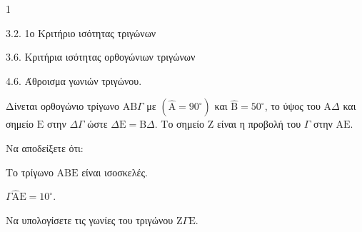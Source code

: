 \begin{ylh}{1}
    \item 3.2. 1ο Κριτήριο ισότητας τριγώνων
    \item 3.6. Κριτήρια ισότητας ορθογώνιων τριγώνων
    \item 4.6. Άθροισμα γωνιών τριγώνου.
\end{ylh}
Δίνεται ορθογώνιο τρίγωνο $\mathrm{A}\mathrm{B}\Gamma$ με $(\hat{\mathrm{A}} = 90^\circ)$ και $\hat{\mathrm{B}} = 50^\circ$, το ύψος του $\mathrm{A}\Delta$ και σημείο $\mathrm{E}$ στην $\Delta\Gamma$ ώστε $\Delta\mathrm{E} = \mathrm{B}\Delta$. Το σημείο $\mathrm{Z}$ είναι η προβολή του $\Gamma$ στην $\mathrm{A}\mathrm{E}$.
\begin{alist}
    \item Να αποδείξετε ότι:
    \begin{rlist}
        \item Το τρίγωνο $\mathrm{A}\mathrm{B}\mathrm{E}$ είναι ισοσκελές. 
        \item $\Gamma\hat{\mathrm{A}}\mathrm{E} = 10^\circ$. 
    \end{rlist}
    \item Να υπολογίσετε τις γωνίες του τριγώνου $\mathrm{Z}\Gamma\mathrm{E}$. 
\end{alist}
